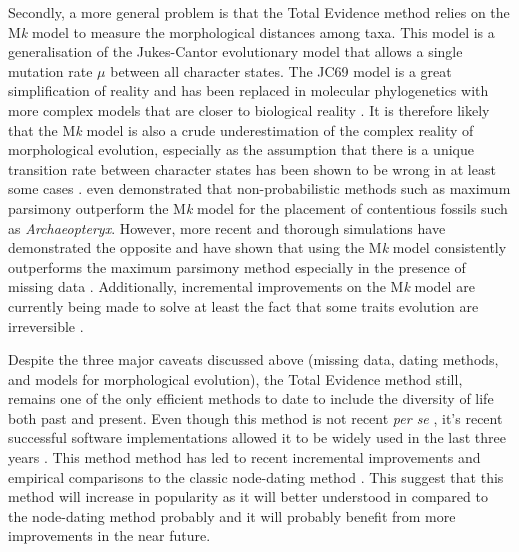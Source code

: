 Secondly, a more general problem is that the Total Evidence method relies on the M\textit{k} model \citep{lewisa2001} to measure the morphological distances among taxa. %
This model is a generalisation of the Jukes-Cantor evolutionary model \citep[JC69;][]{jukes1969evolution} that allows a single mutation rate $\mu$ between all character states.
The JC69 model is a great simplification of reality and has been replaced in molecular phylogenetics with more complex models that are closer to biological reality \citep[e.g. the GTR model that allows a different rate for each different type of nucleotide change;][]{tavare1986}.
It is therefore likely that the M\textit{k} model is also a crude underestimation of the complex reality of morphological evolution, especially as the assumption that there is a unique transition rate between character states has been shown to be wrong in at least some cases \citep[e.g. for Dollo traits that are irreversible;][]{WrightDollo}.
\cite{spencerefficacy2013} even demonstrated that non-probabilistic methods such as maximum parsimony outperform the M\textit{k} model for the placement of contentious fossils such as \textit{Archaeopteryx}.
However, more recent and thorough simulations have demonstrated the opposite and have shown that using the M\textit{k} model consistently outperforms the maximum parsimony method %
especially in the presence of missing data \citep{wrightbayesian2014}.
Additionally, incremental improvements on the M\textit{k} model are currently being made to solve at least the fact that some traits evolution are irreversible \citep[][and personal communications]{Klopfstein12082015}.

Despite the three major caveats discussed above (missing data, dating methods, and models for morphological evolution), the Total Evidence method still, remains one of the only efficient methods to date to include the diversity of life both past and present.
Even though this method is not recent \textit{per se} \citep[e.g.][]{eernissetaxonomic1993}, it's recent successful software implementations \citep{Ronquist2012mrbayes,BEAST2} allowed it to be widely used in the last three years \citep{ronquista2012,Slater2012MEE,Wood01032013,schragocombining2013,beckancient2014,Arcila2015131,Dembo2015,Klopfstein12082015,Carrizo,Wittenberg2015TEM,gavryushkina2015bayesian}.
This method method has led to recent incremental improvements \citep{Klopfstein12082015,gavryushkina2015bayesian} and empirical comparisons to the classic node-dating method \citep{ronquista2012,Arcila2015131}.
This suggest that this method will increase in popularity as it will better understood in compared to the node-dating method probably and it will probably benefit from more improvements in the near future.

